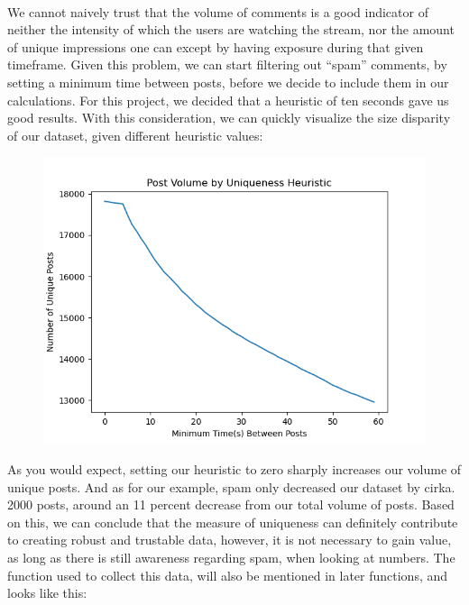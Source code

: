\documentclass{article}
\begin{document}
\paragraph{}
We cannot naively trust that the volume of
comments is a good indicator of neither the intensity
of which the users are watching the stream, nor the amount
of unique impressions one can except by having exposure
during that given timeframe.  Given this problem, we can
start filtering out “spam” comments, by setting a minimum
time between posts, before we decide to include them in our
calculations.  For this project, we decided that a heuristic
of ten seconds gave us good results.
\newline\newline
With this consideration, we can quickly visualize
the size disparity of our dataset, given different
heuristic values:
\begin{figure}[H]
  \centering
  \includegraphics[width=\linewidth]{./resources/chat_activity_uniqueness.png}
\end{figure}
As you would expect, setting our heuristic to zero sharply increases our volume of unique posts. And as for our example, spam only decreased our dataset by cirka. 2000 posts, around an 11 percent decrease from our total volume of posts. 
\newline\newline
Based on this, we can conclude that the measure of uniqueness can definitely contribute to creating robust and trustable data, however, it is not necessary to gain value, as long as there is still awareness regarding spam, when looking at numbers.
The function used to collect this data, will also be mentioned in later functions, and looks like this:
\end{document}

